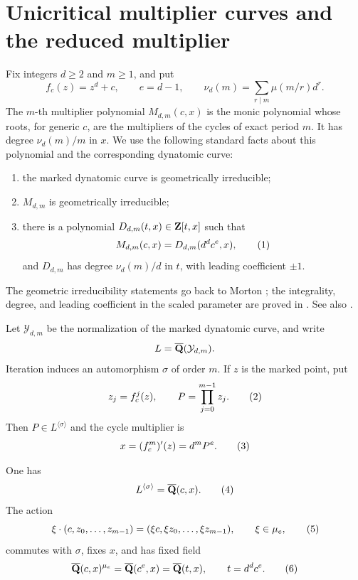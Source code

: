 \section{Unicritical multiplier curves and the reduced multiplier}
\label{sec:unicritical-reduction}

Fix integers $d\ge2$ and $m\ge1$, and put
\[
 f_c(z)=z^d+c,\qquad e=d-1,\qquad
 \nu_d(m)=\sum_{r\mid m}\mu(m/r)d^r.
\]
The $m$-th multiplier polynomial $M_{d,m}(c,x)$ is the monic polynomial
whose roots, for generic $c$, are the multipliers of the cycles of
exact period $m$.  It has degree $\nu_d(m)/m$ in $x$.  We use the
following standard facts about this polynomial and the corresponding
dynatomic curve:
\begin{enumerate}[label=\textup{(\alph*)}]
\item the marked dynatomic curve is geometrically irreducible;
\item $M_{d,m}$ is geometrically irreducible;
\item there is a polynomial $D_{d,m}(t,x)\in\mathbf Z[t,x]$ such that
      \[
       M_{d,m}(c,x)=D_{d,m}(d^dc^e,x),
       \numberthis\label{eq:scaled-multiplier}
      \]
      and $D_{d,m}$ has degree $\nu_d(m)/d$ in $t$, with leading
      coefficient $\pm1$.
\end{enumerate}
The geometric irreducibility statements go back to Morton
\cite[Corollary 1]{Morton1996}; the integrality, degree, and leading
coefficient in the scaled parameter are proved in
\cite[Theorem 1.2 and Propositions 3.3, 3.5]
{MurakamiSanoTakehira2024}.  See also
\cite[Theorem 1.38 and Propositions 1.51, 1.59]{Huguin2021Thesis}.

Let $\mathcal Y_{d,m}$ be the normalization of the marked dynatomic
curve, and write
\[
 L=\overline{\mathbf Q}(\mathcal Y_{d,m}).
\]
Iteration induces an automorphism $\sigma$ of order $m$.  If $z$ is
the marked point, put
\[
 z_j=f_c^j(z),\qquad
 P=\prod_{j=0}^{m-1}z_j.
 \numberthis\label{eq:cycle-product}
\]
Then $P\in L^{\langle\sigma\rangle}$ and the cycle multiplier is
\[
 x=(f_c^m)'(z)=d^mP^e.
 \numberthis\label{eq:multiplier-product}
\]

\begin{lemma}
\label{lem:cycle-scaling-quotients}
One has
\[
 L^{\langle\sigma\rangle}=\overline\Q(c,x).
 \numberthis\label{eq:cycle-fixed-field}
\]
The action
\[
 \xi\cdot(c,z_0,\ldots,z_{m-1})
   =(\xi c,\xi z_0,\ldots,\xi z_{m-1}),
 \qquad \xi\in\mu_e,
 \numberthis\label{eq:scaling-action}
\]
commutes with $\sigma$, fixes $x$, and has fixed field
\[
 \overline\Q(c,x)^{\mu_e}
 =\overline\Q(c^e,x)=\overline\Q(t,x),
 \qquad t=d^dc^e.
 \numberthis\label{eq:scaling-fixed-field}
\]
\end{lemma}

